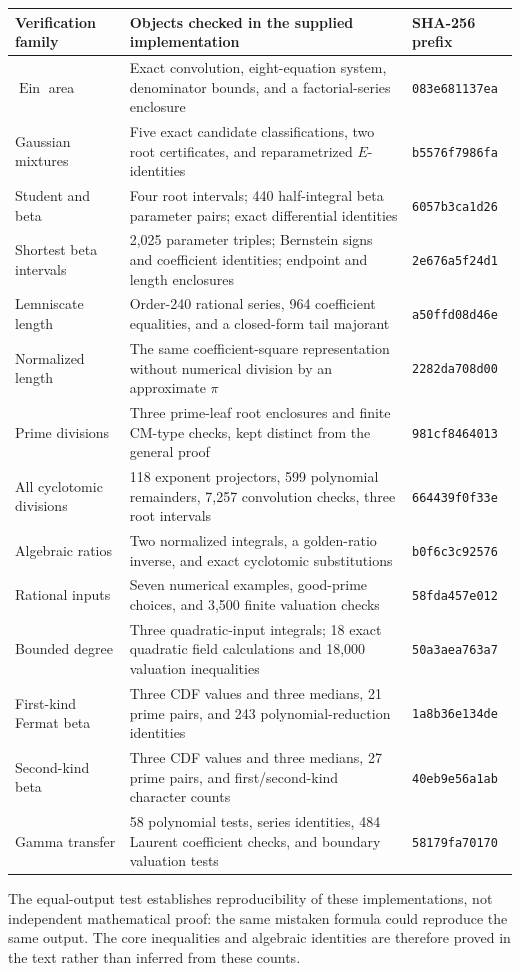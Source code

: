 \documentclass[11pt,a4paper]{article}
\numberwithin{equation}{section}
\theoremstyle{definition}
\theoremstyle{remark}
\newcommand{\Ein}{\operatorname{Ein}}
\begin{document}
\begin{longtable}{@{}P{0.24\textwidth}P{0.53\textwidth}P{0.17\textwidth}@{}}
\toprule
Verification family & Objects checked in the supplied implementation &
SHA-256 prefix\\
\midrule
\endhead
$\Ein$ area & Exact convolution, eight-equation system, denominator bounds,
and a factorial-series enclosure & \texttt{083e681137ea}\\
Gaussian mixtures & Five exact candidate classifications, two root
certificates, and reparametrized $E$-identities & \texttt{b5576f7986fa}\\
Student and beta & Four root intervals; 440 half-integral beta parameter
pairs; exact differential identities & \texttt{6057b3ca1d26}\\
Shortest beta intervals & 2,025 parameter triples; Bernstein signs and
coefficient identities; endpoint and length enclosures & \texttt{2e676a5f24d1}\\
Lemniscate length & Order-240 rational series, 964 coefficient equalities,
and a closed-form tail majorant & \texttt{a50ffd08d46e}\\
Normalized length & The same coefficient-square representation without
numerical division by an approximate $\pi$ & \texttt{2282da708d00}\\
Prime divisions & Three prime-leaf root enclosures and finite CM-type
checks, kept distinct from the general proof & \texttt{981cf8464013}\\
All cyclotomic divisions & 118 exponent projectors, 599 polynomial
remainders, 7,257 convolution checks, three root intervals &
\texttt{664439f0f33e}\\
Algebraic ratios & Two normalized integrals, a golden-ratio inverse, and
exact cyclotomic substitutions & \texttt{b0f6c3c92576}\\
Rational inputs & Seven numerical examples, good-prime choices, and
3,500 finite valuation checks & \texttt{58fda457e012}\\
Bounded degree & Three quadratic-input integrals; 18 exact quadratic
field calculations and 18,000 valuation inequalities & \texttt{50a3aea763a7}\\
First-kind Fermat beta & Three CDF values and three medians, 21 prime
pairs, and 243 polynomial-reduction identities & \texttt{1a8b36e134de}\\
Second-kind beta & Three CDF values and three medians, 27 prime pairs,
and first/second-kind character counts & \texttt{40eb9e56a1ab}\\
Gamma transfer & 58 polynomial tests, series identities, 484 Laurent
coefficient checks, and boundary valuation tests & \texttt{58179fa70170}\\
\bottomrule
\end{longtable}
The equal-output test establishes reproducibility of these implementations,
not independent mathematical proof: the same mistaken formula could
reproduce the same output. The core inequalities and algebraic identities
are therefore proved in the text rather than inferred from these counts.
\end{document}

